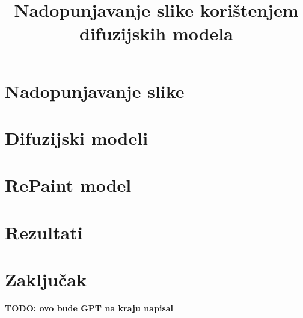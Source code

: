 \documentclass[10pt, a4paper, croatian]{article}
\title{Nadopunjavanje slike korištenjem difuzijskih modela}
\begin{document}
\maketitleabstract

\section{Nadopunjavanje slike}

\section{Difuzijski modeli}

\section{RePaint model}

\section{Rezultati}

\section{Zaključak}

\textbf{TODO: ovo bude GPT na kraju napisal}



 
\end{document}
